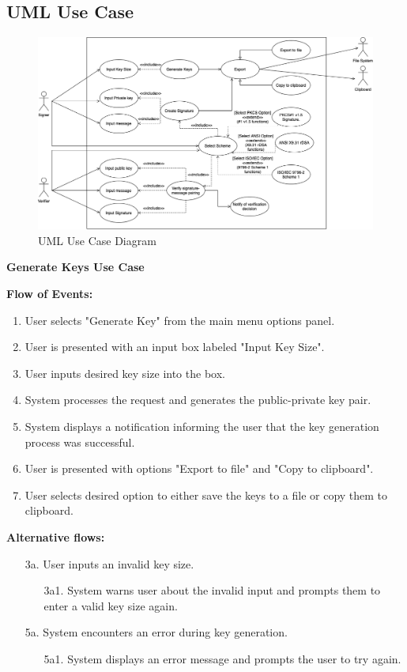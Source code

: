 \documentclass[]{final_report}
\theoremstyle{definition}
\begin{document}
\subsection{UML Use Case}
\begin{figure}[H]
    \centering
    \includegraphics[scale=0.48]{POC_USE-CASE.png}
    \caption{UML Use Case Diagram}
    \label{fig:uc}
\end{figure}



\textbf{Generate Keys Use Case}

\noindent\textbf{Flow of Events:}
\begin{enumerate}
    \item User selects "Generate Key" from the main menu options panel.
    \item User is presented with an input box labeled "Input Key Size".
    \item User inputs desired key size into the box.
    \item System processes the request and generates the public-private key pair.
    \item System displays a notification informing the user that the key generation process was successful.
    \item User is presented with options "Export to file" and "Copy to clipboard".
    \item User selects desired option to either save the keys to a file or copy them to clipboard.
\end{enumerate}

\noindent\textbf{Alternative flows:}
\begin{enumerate}
    \item[3a.] User inputs an invalid key size.
    \begin{enumerate}
        \item[3a1.] System warns user about the invalid input and prompts them to enter a valid key size again.
    \end{enumerate}
    \item[5a.] System encounters an error during key generation.
    \begin{enumerate}
        \item[5a1.] System displays an error message and prompts the user to try again.
    \end{enumerate}
\end{enumerate}
\end{document}
